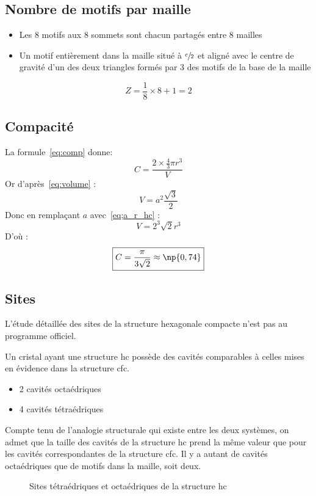 \subsection{Nombre de motifs par maille}
\begin{itemize}
    \item Les 8 motifs aux 8 sommets sont chacun partagés entre
        8 mailles
    \item Un motif entièrement dans la maille situé à
        $\sfrac{c}{2}$ et aligné avec le centre de gravité d'un
        des deux triangles formés par 3 des motifs de la base de
        la maille
\end{itemize}
\begin{equation}
    Z = \frac{1}{8} \times 8 + 1 = 2
\end{equation}

\subsection{Compacité}
La formule~\ref{eq:comp} donne:
\begin{equation*}
    C = \frac{2 \times \frac{4}{3}\pi r^3}{V}
\end{equation*}
Or d'après~\ref{eq:volume} :
\begin{equation*}
    V=a^2 \frac{\sqrt{3}}{2}
\end{equation*}
Donc en remplaçant $a$ avec~\ref{eq;a_r_hc} :
\begin{equation}
    V=2^3\sqrt{2}r^3 \label{eq:V_hc}
\end{equation}
D'où :
\begin{equation}
    \boxed{C = \frac{\pi}{3\sqrt{2}} \approx \np{0,74}}
    \label{eq:comp_hc}
\end{equation}

\subsection{Sites}
\begin{rem}
    L'étude détaillée des sites de la structure hexagonale
    compacte n'est pas au programme officiel.
\end{rem}
Un cristal ayant une structure hc possède des cavités comparables
à celles mises en évidence dans la structure cfc.
\begin{itemize}
    \item 2 cavités octaédriques
    \item 4 cavités tétraédriques
\end{itemize}
Compte tenu de l’analogie structurale qui existe entre les deux
systèmes, on admet que la taille des cavités de la structure
hc prend la même valeur que pour les cavités correspondantes
de la structure cfc. Il y a autant de cavités octaédriques que
de motifs dans la maille, soit deux.
\begin{figure}
    \centering
    
    \caption{Sites tétraédriques et octaédriques
        de la structure hc}
\end{figure}


